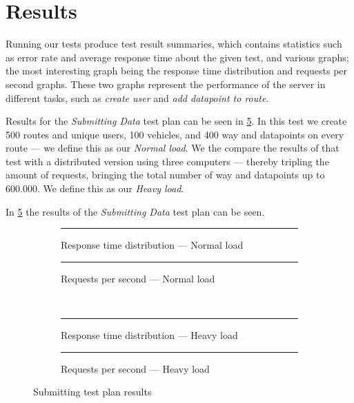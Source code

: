 \section{Results}
Running our tests produce test result summaries, which contains statistics such as error rate and average response time about the given test, and various graphs;
the most interesting graph being the response time distribution and requests per second graphs.
These two graphs represent the performance of the server in different tasks, such as \textit{create user} and \textit{add datapoint to route}.

Results for the \textit{Submitting Data} test plan can be seen in \cref{fig:submit_test_results}.
In this test we create 500 routes and unique users, 100 vehicles, and 400 way and datapoints on every route --- we define this as our \textit{Normal load}.
We the compare the results of that test with a distributed version using three computers --- thereby tripling the amount of requests, bringing the total number of way and datapoints up to $600.000$.
We define this as our \textit{Heavy load}.

\bigskip
In \cref{fig:submit_test_results} the results of the \textit{Submitting Data} test plan can be seen.

\begin{figure}[!htb]
    \centering
    \begin{subfigure}[b]{0.5\textwidth}
        \centering
        \rule{5cm}{5cm}
        \caption{Response time distribution --- Normal load}\label{fig:submit_resp_t_dist}
    \end{subfigure}\hfill%
    \begin{subfigure}[b]{0.5\textwidth}
        \centering
        \rule{5cm}{5cm}
        \caption{Requests per second --- Normal load}\label{fig:submit_reqs_p_sec}
    \end{subfigure}\\
    \begin{subfigure}[b]{0.5\textwidth}
        \centering
        \rule{5cm}{5cm}
        \caption{Response time distribution --- Heavy load}\label{fig:submit_resp_t_dist_heavy}
    \end{subfigure}\hfill%
    \begin{subfigure}[b]{0.5\textwidth}
        \centering
        \rule{5cm}{5cm}
        \caption{Requests per second --- Heavy load}\label{fig:submit_reqs_p_sec_heavy}
    \end{subfigure}
    \caption{Submitting test plan results}\label{fig:submit_test_results}
\end{figure}

